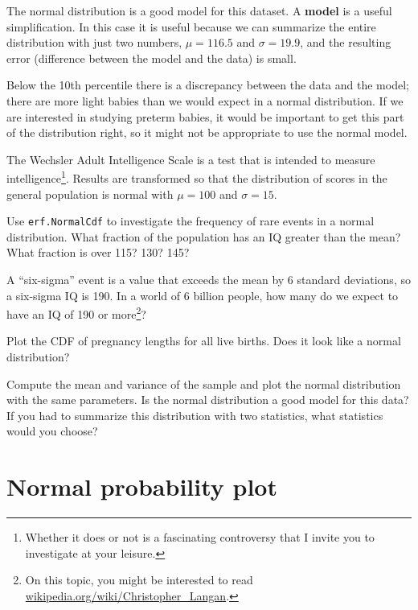 \documentclass[12pt]{book}
\begin{document}
The normal distribution is a good model for this dataset.  A {\bf
  model} is a useful simplification.  In this case it is useful
because we can summarize the entire distribution with just two
numbers, $\mu=116.5$ and $\sigma=19.9$, and the resulting error
(difference between the model and the data) is small.

Below the 10th percentile there is a discrepancy between the data
and the model; there are more light babies than we would expect in
a normal distribution.  If we are interested in studying preterm
babies, it would be important to get this part of the distribution
right, so it might not be appropriate to use the normal
model.

\begin{ex}

The Wechsler Adult Intelligence Scale is a test that is intended
to measure intelligence\footnote{Whether it does or not is a
fascinating controversy that I invite you to investigate at your
leisure.}.  Results are transformed so that the distribution of scores
in the general population is normal with $\mu=100$ and $\sigma=15$.

Use {\tt erf.NormalCdf} to investigate the frequency of rare events in
a normal distribution.  What fraction of the population has an IQ
greater than the mean?  What fraction is over 115?  130?  145?

A ``six-sigma'' event is a value that exceeds the mean by 6 standard
deviations, so a six-sigma IQ is 190.  In a world of 6 billion people,
how many do we expect to have an IQ of 190 or more\footnote{On this
  topic, you might be interested to read
  \url{wikipedia.org/wiki/Christopher_Langan}.}?

\end{ex}


\begin{ex}

Plot the CDF of pregnancy lengths for all live births.  Does it
look like a normal distribution?

Compute the mean and variance of the sample and plot the normal
distribution with the same parameters.  Is the normal distribution a
good model for this data?  If you had to summarize this distribution
with two statistics, what statistics would you choose?

\end{ex}


\section{Normal probability plot}
\end{document}
